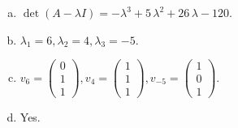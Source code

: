 \begin{questions}
\begin{solution}
\begin{enumerate}[(a)]
\item $\det(A-\lambda I)=-{\lambda}^{3} + 5 \, {\lambda}^{2} + 26 \, {\lambda} - 120$.
\item ${\lambda}_1=6, {\lambda}_2=4, {\lambda}_3=-5$.
\item $v_{6}=\left(\begin{array}{r}
0 \\
1 \\
1
\end{array}\right), v_{4}=\left(\begin{array}{r}
1 \\
1 \\
1
\end{array}\right), v_{-5}=\left(\begin{array}{r}
1 \\
0 \\
1
\end{array}\right)$.
\item Yes.
\end{enumerate}
\end{solution}

\end{questions}

\newpage


\begin{center}
\end{center}

